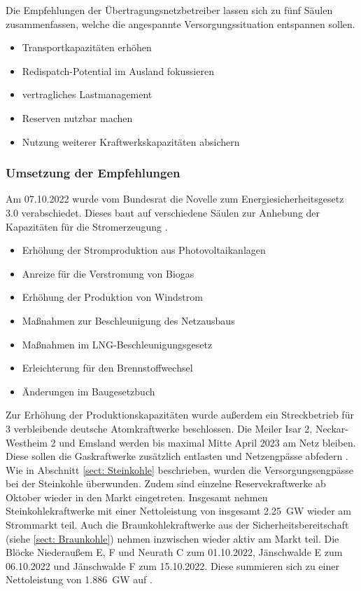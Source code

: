 			Die Empfehlungen der Übertragungsnetzbetreiber lassen sich zu fünf Säulen zusammenfassen, welche die angespannte Versorgungssituation entspannen sollen.
			\begin{itemize}
				\item Transportkapazitäten erhöhen
				\item Redispatch-Potential im Ausland fokussieren
				\item vertragliches Lastmanagement
				\item Reserven nutzbar machen
				\item Nutzung weiterer Kraftwerkskapazitäten absichern
			\end{itemize}
		
		\subsubsection{Umsetzung der Empfehlungen} \label{sect: Atomausstieg}
			
			Am 07.10.2022 wurde vom Bundesrat die Novelle zum Energiesicherheitsgesetz 3.0 verabschiedet. 
			Dieses baut auf verschiedene Säulen zur Anhebung der Kapazitäten für die Stromerzeugung \cite{EnSiG}. 
			\begin{itemize}
				\item Erhöhung der Stromproduktion aus Photovoltaikanlagen
				\item Anreize für die Verstromung von Biogas
				\item Erhöhung der Produktion von Windstrom
				\item Maßnahmen zur Beschleunigung des Netzausbaus
				\item Maßnahmen im LNG-Beschleunigungsgesetz
				\item Erleichterung für den Brennstoffwechsel
				\item Änderungen im Baugesetzbuch
			\end{itemize}
			
			Zur Erhöhung der Produktionskapazitäten wurde außerdem ein Streckbetrieb für 3 verbleibende deutsche Atomkraftwerke beschlossen. 
			Die Meiler Isar 2, Neckar-Westheim 2 und Emsland werden bis maximal Mitte April 2023 am Netz bleiben. 
			Diese sollen die Gaskraftwerke zusätzlich entlasten und Netzengpässe abfedern \cite{Laufzeitverlängerung}. 
			Wie in Abschnitt \ref{sect: Steinkohle} beschrieben, wurden die Versorgungsengpässe bei der Steinkohle überwunden. 
			Zudem sind einzelne Reservekraftwerke ab Oktober wieder in den Markt eingetreten.
			Insgesamt nehmen Steinkohlekraftwerke mit einer Nettoleistung von insgesamt \SI{2,25}{\giga \watt} wieder am Strommarkt teil.
			Auch die Braunkohlekraftwerke aus der Sicherheitsbereitschaft (siehe \ref{sect: Braunkohle}) nehmen inzwischen wieder aktiv am Markt teil.
			Die Blöcke Niederaußem E, F und Neurath C zum 01.10.2022, Jänschwalde E zum 06.10.2022 und Jänschwalde F zum 15.10.2022. 
			Diese summieren sich zu einer Nettoleistung von \SI{1,886}{\giga \watt} auf \cite{Wiedereintritt_Kraftwerke}. 
		
